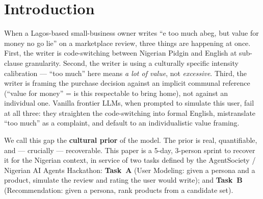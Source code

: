 \documentclass[sigconf,nonacm,balance]{acmart}
\begin{document}
\section{Introduction}

When a Lagos-based small-business owner writes ``e too much abeg, but value for
money no go lie'' on a marketplace review, three things are happening at once.
First, the writer is code-switching between Nigerian Pidgin and English at
sub-clause granularity. Second, the writer is using a culturally specific
intensity calibration --- ``too much'' here means \emph{a lot of value}, not
\emph{excessive}. Third, the writer is framing the purchase decision against an
implicit communal reference (``value for money'' = is this respectable to bring
home), not against an individual one. Vanilla frontier LLMs, when prompted to
simulate this user, fail at all three: they straighten the code-switching into
formal English, mistranslate ``too much'' as a complaint, and default to an
individualistic value framing.

We call this gap the \textbf{cultural prior} of the model. The prior is real,
quantifiable, and --- crucially --- recoverable. This paper is a 5-day,
3-person sprint to recover it for the Nigerian context, in service of two
tasks defined by the AgentSociety / Nigerian AI Agents Hackathon:
\textbf{Task~A} (User Modeling: given a persona and a product, simulate the
review and rating the user would write); and \textbf{Task~B} (Recommendation:
given a persona, rank products from a candidate set).
\end{document}
